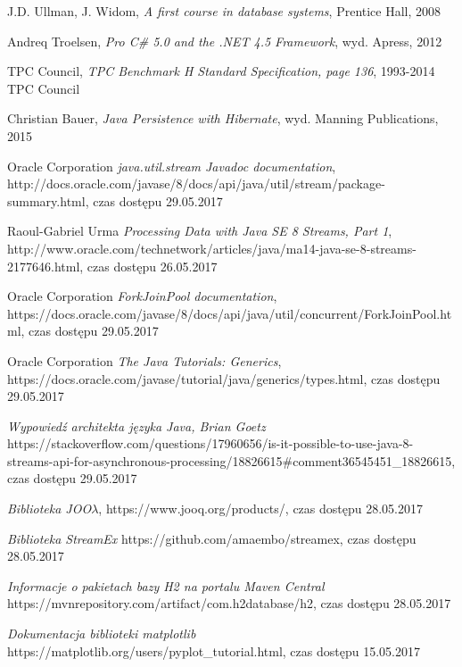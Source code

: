 \documentclass[12pt,twoside,openright]{extarticle}
\begin{document}
\cleardoublepage
\begin{thebibliography}{9}

        J.D. Ullman, J. Widom,
        \textit{A first course in database systems}, 
        Prentice Hall, 2008

        Andreq Troelsen,
        \textit{Pro C\# 5.0 and the .NET 4.5 Framework}, wyd. Apress, 2012

        TPC Council,
        \textit{TPC Benchmark H Standard Specification, page 136},
        1993-2014 TPC Council

        Christian Bauer,
        \textit{Java Persistence with Hibernate},
        wyd. Manning Publications, 2015

        Oracle Corporation
        \textit{java.util.stream Javadoc documentation},
        http://docs.oracle.com/javase/8/docs/api/java/util/stream/package-summary.html, czas dostępu 29.05.2017

        Raoul-Gabriel Urma
        \textit{Processing Data with Java SE 8 Streams, Part 1}, 
        http://www.oracle.com/technetwork/articles/java/ma14-java-se-8-streams-2177646.html, czas dostępu 26.05.2017

        Oracle Corporation
        \textit{ForkJoinPool documentation}, 
        https://docs.oracle.com/javase/8/docs/api/java/util/concurrent/ForkJoinPool.html, czas dostępu 29.05.2017

        Oracle Corporation
        \textit{The Java Tutorials: Generics}, 
        https://docs.oracle.com/javase/tutorial/java/generics/types.html, czas dostępu 29.05.2017

        \textit{Wypowiedź architekta języka Java, Brian Goetz}
        https://stackoverflow.com/questions/17960656/is-it-possible-to-use-java-8-streams-api-for-asynchronous-processing/18826615\#comment36545451\_18826615, czas dostępu 29.05.2017

        \textit{Biblioteka JOO$\lambda$}, https://www.jooq.org/products/, czas dostępu 28.05.2017

        \textit{Biblioteka StreamEx} https://github.com/amaembo/streamex, czas dostępu 28.05.2017

        \textit{Informacje o pakietach bazy H2 na portalu Maven Central} https://mvnrepository.com/artifact/com.h2database/h2, czas dostępu 28.05.2017

        \textit{Dokumentacja biblioteki matplotlib} https://matplotlib.org/users/pyplot\_tutorial.html, czas dostępu 15.05.2017

\end{thebibliography}
\end{document}
